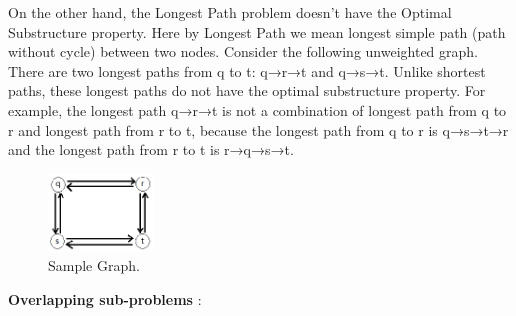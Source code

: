 \documentclass[12pt]{article}
\begin{document}
On the other hand, the Longest Path problem doesn’t have the Optimal Substructure property. Here by Longest Path we mean longest simple path (path without cycle) between two nodes. Consider the following unweighted graph. There are two longest paths from q to t: q→r→t and q→s→t. Unlike shortest paths, these longest paths do not have the optimal substructure property. For example, the longest path q→r→t is not a combination of longest path from q to r and longest path from r to t, because the longest path from q to r is q→s→t→r and the longest path from r to t is r→q→s→t.
\begin{figure}[H]
\centering
\includegraphics[width=0.25\textwidth]{longestpath.png}
\caption{\label{fig:graph_1}Sample Graph.}
\end{figure}
\vspace{6mm}
\textbf{Overlapping sub-problems} :
\end{document}
